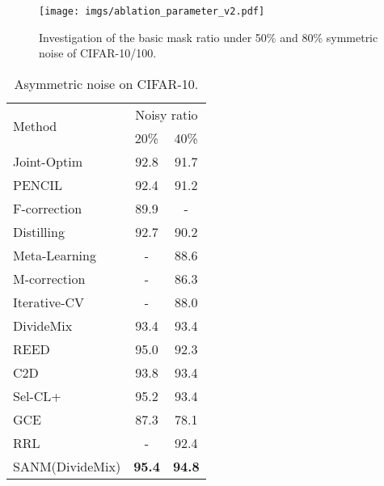\documentclass[10pt,twocolumn,letterpaper]{article}
\begin{document}
\begin{figure*}[!t]
 \centering
\small
 \begin{minipage}{0.9\textwidth}
    \centering
    \texttt{[image: imgs/ablation\_parameter\_v2.pdf]}
\end{minipage}
 \vspace{-1em}
  \caption
    {
    \small
        Investigation of the basic mask ratio  under 50\% and 80\% symmetric noise of CIFAR-10/100.
      }
  \label{fig:ablation_parameter}
 \vspace{-2mm}
 \end{figure*}

\begin{table*}[t]
\begin{minipage}{0.66\linewidth}
\begin{minipage}{0.47\linewidth}
    \footnotesize
    \caption{Asymmetric noise on CIFAR-10.}
    \vspace{-1em}
    \centering
    \renewcommand{\arraystretch}{1.1}
    {\begin{tabular}{p{2.4cm}|cc}
        \hline
        \multirow{2}{*}{Method}  & \multicolumn{2}{c}{Noisy ratio} \\ \cline{2-3} 
        & 20\% & 40\% \\ \hline
        Joint-Optim\cite{tanaka2018joint}              & 92.8    & 91.7 \\ 
        
        PENCIL~\cite{yi2019probabilistic}                & 92.4   & 91.2 \\ 
        F-correction~\cite{patrini2017making}            & 89.9    & - \\
        Distilling~\cite{zhang2020distilling}          & 92.7    & 90.2 \\
Meta-Learning~\cite{MLNT}                         &  -      & 88.6 \\ 
        M-correction~\cite{arazo2019unsupervised}        &  -      & 86.3 \\ 
        Iterative-CV~\cite{chen2019understanding}        &  -      & 88.0 \\ 
        DivideMix~\cite{li2020dividemix}     & 93.4    & 93.4 \\ 
        REED ~\cite{zhang2020decoupling}                 & {95.0}    & {92.3}    \\
        C2D ~\cite{zheltonozhskii2022contrast}                 & {93.8}    & {93.4}    \\
        Sel-CL+ ~\cite{li2022selective}                 & 95.2    & {93.4}    \\
        GCE ~\cite{ghosh2021contrastive}                 & {87.3}    & {78.1}    \\
        RRL ~\cite{li2021learning}                 & -    & {92.4}    \\        
        \hline
        SANM(DivideMix)                                            & \textbf{95.4}    & \textbf{94.8}    \\
        \hline
    \end{tabular}}
    \label{tab:cifar10asy}
    

\end{minipage}
\end{minipage}
\end{table*}
\end{document}
